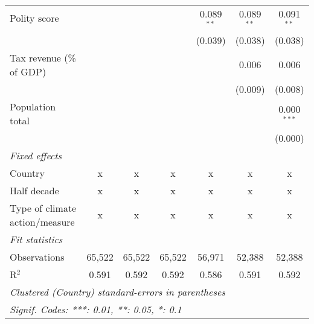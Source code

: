 \begin{tabular}{lcccccc}
   Polity score                                                            &         &                &                & 0.089$^{**}$   & 0.089$^{**}$   & 0.091$^{**}$\\   
                                                                           &         &                &                & (0.039)        & (0.038)        & (0.038)\\   
   Tax revenue (\% of GDP)                                                 &         &                &                &                & 0.006          & 0.006\\   
                                                                           &         &                &                &                & (0.009)        & (0.008)\\   
   Population total                                                        &         &                &                &                &                & 0.000$^{***}$\\   
                                                                           &         &                &                &                &                & (0.000)\\   
   \emph{Fixed effects}\\
   Country                                                                 & x       & x              & x              & x              & x              & x\\  
   Half decade                                                             & x       & x              & x              & x              & x              & x\\  
   Type of climate action/measure                                          & x       & x              & x              & x              & x              & x\\  
   \midrule \emph{Fit statistics}\\
   Observations                                                            & 65,522  & 65,522         & 65,522         & 56,971         & 52,388         & 52,388\\  
   R$^2$                                                                   & 0.591   & 0.592          & 0.592          & 0.586          & 0.591          & 0.592\\  
   \midrule
   \multicolumn{7}{l}{\emph{Clustered (Country) standard-errors in parentheses}}\\
   \multicolumn{7}{l}{\emph{Signif. Codes: ***: 0.01, **: 0.05, *: 0.1}}\\
\end{tabular}
\par\endgroup


